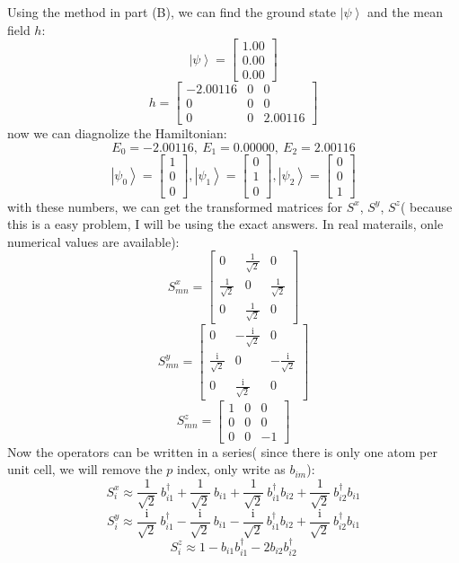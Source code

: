 \documentclass[letter]{article}
\newcommand{\ii}{\mathrm{i}}
\begin{document}
Using the method in part (B), we can find the ground state $\left|\psi\right>$ and the mean field $h$:
$$
\left|\psi\right>=\begin{bmatrix}
    1.00 \\
0.00 \\
0.00
    \end{bmatrix}
$$
$$
h=\begin{bmatrix}
    -2.00116 & 0 & 0 \\
    0 &  0 & 0 \\
    0 &  0 & 2.00116
    \end{bmatrix}
$$
now we can diagnolize the Hamiltonian:
$$E_{0}=-2.00116,\ E_{1}=0.00000,\ E_{2}=2.00116
$$
$$\left|\psi_0\right>=\begin{bmatrix}
    1 \\
0 \\
0
    \end{bmatrix},\left|\psi_1\right>=\begin{bmatrix}
       0 \\
    1 \\
    0
        \end{bmatrix},\left|\psi_2\right>=\begin{bmatrix}
            0 \\
            0 \\
            1
            \end{bmatrix}
$$
with these numbers, we can get the transformed matrices for $S^x$, $S^y$, $S^z$( because this is a easy problem, I will be using the exact answers. In real materails, onle numerical values are available):
$$S^x_{mn}=\begin{bmatrix}
    0& \frac{1}{\sqrt{2}} & 0\\
    \frac{1}{\sqrt{2}} &  0 & \frac{1}{\sqrt{2}}\\
0& \frac{1}{\sqrt{2}}&0
    \end{bmatrix}$$$$
S^y_{mn}=\begin{bmatrix}
    0& -\frac{\ii}{\sqrt{2}} & 0\\
    \frac{\ii}{\sqrt{2}} &  0 & -\frac{\ii}{\sqrt{2}}\\
0& \frac{\ii}{\sqrt{2}}&0
    \end{bmatrix}$$ $$
S^z_{mn}=\begin{bmatrix}
1 & 0 & 0 \\
0 &  0 & 0 \\
0 &  0 & -1
\end{bmatrix}
$$
Now the operators can be written in a series( since there is only one atom per unit cell, we will remove the $p$ index, only write as $b_{im}$):$$
S_{i}^{x}\approx\frac{1}{\sqrt{2}}\ b_{i1}^{\dagger}+\frac{1}{\sqrt{2}}\ b_{i1}+\frac{1}{\sqrt{2}}\  b_{i1}^{\dagger}b_{i2}+\frac{1}{\sqrt{2}}\  b_{i2}^{\dagger}b_{i1}$$$$
S_{i}^{y}\approx\frac{\ii}{\sqrt{2}}\ b_{i1}^{\dagger}-\frac{\ii}{\sqrt{2}}\ b_{i1}-\frac{\ii}{\sqrt{2}}\ b_{i1}^{\dagger}b_{i2}+\frac{\ii}{\sqrt{2}}\ b_{i2}^{\dagger}b_{i1}$$$$
S_{i}^{z}\approx1-b_{i1}b_{i1}^{\dagger}-2b_{i2}b_{i2}^{\dagger}$$
\end{document}
